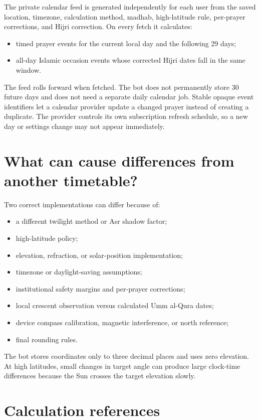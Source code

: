 \documentclass[11pt,a4paper]{article}
\begin{document}
The private calendar feed is generated independently for each user from the saved location, timezone, calculation method, madhab, high-latitude rule, per-prayer corrections, and Hijri correction. On every fetch it calculates:
\begin{itemize}
  \item timed prayer events for the current local day and the following 29 days;
  \item all-day Islamic occasion events whose corrected Hijri dates fall in the same window.
\end{itemize}

The feed rolls forward when fetched. The bot does not permanently store 30 future days and does not need a separate daily calendar job. Stable opaque event identifiers let a calendar provider update a changed prayer instead of creating a duplicate. The provider controls its own subscription refresh schedule, so a new day or settings change may not appear immediately.

\section[Why another timetable may differ]{What can cause differences from another timetable?}

Two correct implementations can differ because of:
\begin{itemize}
  \item a different twilight method or Asr shadow factor;
  \item high-latitude policy;
  \item elevation, refraction, or solar-position implementation;
  \item timezone or daylight-saving assumptions;
  \item institutional safety margins and per-prayer corrections;
  \item local crescent observation versus calculated Umm al-Qura dates;
  \item device compass calibration, magnetic interference, or north reference;
  \item final rounding rules.
\end{itemize}

The bot stores coordinates only to three decimal places and uses zero elevation. At high latitudes, small changes in target angle can produce large clock-time differences because the Sun crosses the target elevation slowly.

\section[References]{Calculation references}
\end{document}
